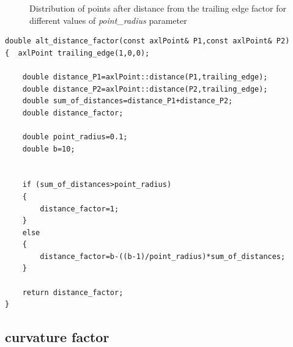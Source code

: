 \documentclass[12pt,a4paper]{article}
\begin{document}
 

\begin{figure}[h]
  \centering
  \hfill
  \caption{Distribution of points after distance from the trailing edge factor for different values of \textit{point\_{radius}} parameter }
\end{figure}


\pagebreak
\begin{lstlisting}[label=some-code,caption=distance from trailing edge factor]
double alt_distance_factor(const axlPoint& P1,const axlPoint& P2)
{  axlPoint trailing_edge(1,0,0);

    double distance_P1=axlPoint::distance(P1,trailing_edge);
    double distance_P2=axlPoint::distance(P2,trailing_edge);
    double sum_of_distances=distance_P1+distance_P2;
    double distance_factor;

    double point_radius=0.1;
    double b=10;


    if (sum_of_distances>point_radius)
    {
        distance_factor=1;
    }
    else
    {
        distance_factor=b-((b-1)/point_radius)*sum_of_distances;
    }

    return distance_factor;
}
\end{lstlisting}

 

 
\subsection{curvature factor}
\end{document}
